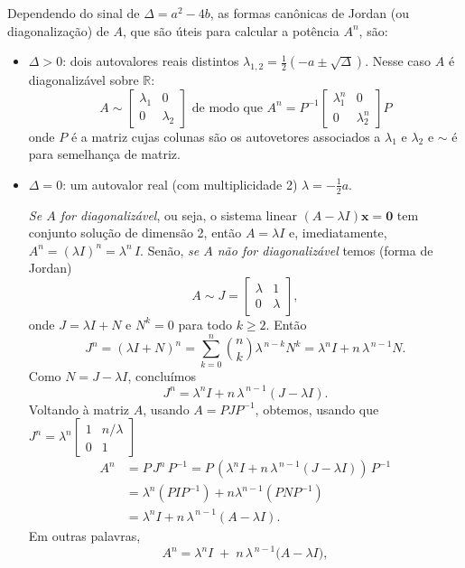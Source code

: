 \documentclass{article}
\begin{document}
Dependendo do sinal de \(\Delta= a^2 - 4b\), as formas canônicas de
Jordan (ou diagonalização) de \(A\), que são úteis para calcular a
potência $A^n$, são:

\begin{itemize}
\item \(\displaystyle \Delta>0\): dois autovalores reais distintos
  \(
  \lambda_{1,2} = \tfrac12 ({-a\pm\sqrt{\Delta}}).
  \)
  Nesse caso \(A\) é diagonalizável sobre \(\mathbb{R}\):
  \[
    A \sim
    \begin{bmatrix}
      \lambda_1 & 0 \\[3pt]
      0 & \lambda_2
    \end{bmatrix}
    \text{ de modo que } A^n =  P^{-1} \begin{bmatrix}
      \lambda_1^n & 0 \\[3pt]
      0 & \lambda_2^n 
    \end{bmatrix}P
  \]
  onde $P$ é a matriz cujas colunas são os autovetores associados a
  $\lambda_1$ e $\lambda_2$ e $\sim$ é para semelhança de matriz.
  
\item \(\displaystyle \Delta=0\): um autovalor real (com
  multiplicidade 2) \( \lambda = -\tfrac12 {a}.\)
  
  \emph{Se \(A\) for diagonalizável}, ou seja, o sistema linear
  \( (A-\lambda I)\mathbf{x} = \mathbf{0} \) tem conjunto solução de
  dimensão 2, então \(A=\lambda I\) e, imediatamente,
  \(A^n = (\lambda I)^n = \lambda^n\,I\).
  Senão, \emph{se \(A\) não for diagonalizável} temos (forma de Jordan)
  \[
    A \sim J = 
    \begin{bmatrix}
      \lambda & 1\\
      0       & \lambda
    \end{bmatrix},
  \]
  onde \(J=\lambda I+N\) e \(N^k=0\) para todo $k\geq 2$. Então
  \[
    J^n = (\lambda I + N)^n
    = \sum_{k=0}^{n} \binom{n}{k}\lambda^{\,n-k}N^k
    = \lambda^n I + n\,\lambda^{\,n-1}N.
  \]
  Como \(N=J-\lambda I\), concluímos
  \[
    J^n
    = \lambda^n I + n\,\lambda^{\,n-1}(J-\lambda I).
  \]
  Voltando à matriz \(A\), usando \(A=PJP^{-1}\), obtemos, usando que $J^n = \lambda^n
  \begin{bmatrix}
    1&n/\lambda\\0&1
  \end{bmatrix}$
  \[
    \begin{aligned}
      A^n  & = P\,J^n\,P^{-1} = P\, (\lambda^n I + n\,\lambda^{\,n-1}(J-\lambda I)) \,P^{-1} \\
      &=
      \lambda^n (PIP^{-1})+n\lambda^{n-1} (PNP^{-1}) \\ &
      = \lambda^n I + n\,\lambda^{\,n-1}(A-\lambda I).
    \end{aligned}\]
  Em outras palavras,
  \[
    \boxed{
      A^n = \lambda^n I \;+\; n\,\lambda^{\,n-1}\bigl(A-\lambda I\bigr),
    }
  \]
  

\end{itemize}
\end{document}
